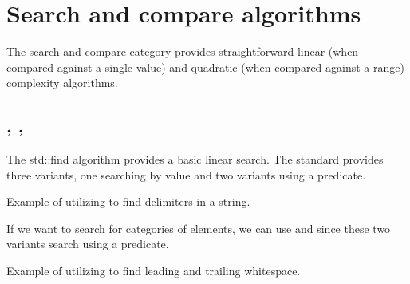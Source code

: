 \section{Search and compare algorithms}

The search and compare category provides straightforward linear (when compared against a single value) and quadratic (when compared against a range) complexity algorithms.
\raggedbottom
\subsection{\texorpdfstring{, , }{\texttt{std::find}, \texttt{std::find\_if}, \texttt{std::find\_if\_not}}}

The std::find algorithm provides a basic linear search. The standard provides three variants, one searching by value and two variants using a predicate.



\begin{codebox}[]{\href{https://compiler-explorer.com/z/P993bPz39}{\ExternalLink}}
\footnotesize Example of utilizing  to find delimiters in a string.
\tcblower
{}
\end{codebox}

If we want to search for categories of elements, we can use  and  since these two variants search using a predicate.

\begin{codebox}[]{\href{https://compiler-explorer.com/z/n9vTGsE4T}{\ExternalLink}}
\footnotesize Example of utilizing  to find leading and trailing whitespace.
\tcblower
{}
\end{codebox}

\subsection{\texorpdfstring{}{\texttt{std::adjacent\_find}}}


